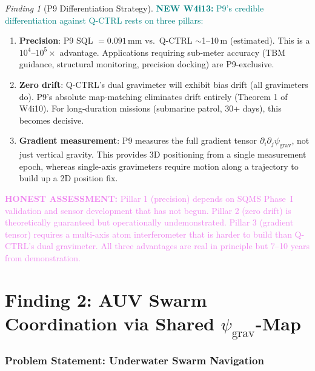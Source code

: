 \documentclass[11pt]{article}
\theoremstyle{definition}
\theoremstyle{remark}
\newtheorem{finding}[theorem]{Finding}
\newcommand{\psigrav}{\psi_{\mathrm{grav}}}
\newcommand{\honest}[1]{\textcolor{violet}{\textbf{HONEST ASSESSMENT:} #1}}
\newcommand{\newfinding}[1]{\textcolor{teal}{\textbf{NEW W4i13:} #1}}
\begin{document}
\begin{finding}[P9 Differentiation Strategy]
\label{find:p9-differentiation}
\newfinding{P9's credible differentiation against Q-CTRL rests on three
pillars:}
\begin{enumerate}[nosep]
\item \textbf{Precision}: P9 SQL $= 0.091$\,mm vs.\ Q-CTRL $\sim$1--10\,m
  (estimated). This is a $10^4$--$10^5\times$ advantage. Applications
  requiring sub-meter accuracy (TBM guidance, structural monitoring,
  precision docking) are P9-exclusive.
\item \textbf{Zero drift}: Q-CTRL's dual gravimeter will exhibit bias
  drift (all gravimeters do). P9's absolute map-matching eliminates
  drift entirely (Theorem 1 of W4i10). For long-duration missions
  (submarine patrol, 30+ days), this becomes decisive.
\item \textbf{Gradient measurement}: P9 measures the full gradient tensor
  $\partial_i\partial_j\psigrav$, not just vertical gravity. This provides
  3D positioning from a single measurement epoch, whereas single-axis
  gravimeters require motion along a trajectory to build up a
  2D position fix.
\end{enumerate}

\honest{Pillar 1 (precision) depends on SQMS Phase~I validation and
sensor development that has not begun. Pillar 2 (zero drift) is
theoretically guaranteed but operationally undemonstrated. Pillar 3
(gradient tensor) requires a multi-axis atom interferometer that is
harder to build than Q-CTRL's dual gravimeter. All three advantages
are real in principle but 7--10 years from demonstration.}
\end{finding}

\part{Finding 2: AUV Swarm Coordination via Shared $\psigrav$-Map}
\label{part:auv-swarm}

\section{Problem Statement: Underwater Swarm Navigation}
\label{sec:auv-problem}
\end{document}
